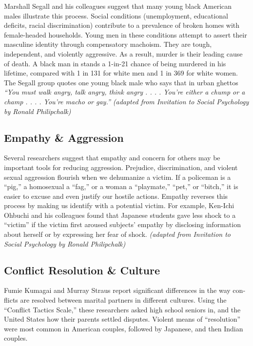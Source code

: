 \documentclass[
]{book}
\begin{document}
Marshall Segall and his colleagues suggest that many young black American males illustrate this process. Social conditions (unemployment, educational deficits, racial discrimination) contribute to a prevalence of broken homes with female-headed households. Young men in these conditions attempt to assert their masculine identity through compensatory machoism. They are tough, independent, and violently aggressive. As a result, murder is their leading cause of death. A black man in stands a 1-in-21 chance of being murdered in his lifetime, compared with 1 in 131 for white men and 1 in 369 for white women. The Segall group quotes one young black male who says that in urban ghettos \emph{``You must walk angry, talk angry, think angry . . . . You're either a chump or a champ . . . . You're macho or gay.'' (adapted from Invitation to Social Psychology by Ronald Philipchalk)}

\hypertarget{empathy-aggression}{%
\subsection*{Empathy \& Aggression}\label{empathy-aggression}}

Several researchers suggest that empathy and concern for others may be important tools for reducing aggression. Prejudice, discrimination, and violent sexual aggression flourish when we dehumanize a victim. If a policeman is a ``pig,'' a homosexual a ``fag,'' or a woman a ``playmate,'' ``pet,'' or ``bitch,'' it is easier to excuse and even justify our hostile actions. Empathy reverses this process by making us identify with a potential victim. For example, Ken-Ichi Ohbuchi and his colleagues found that Japanese students gave less shock to a ``victim'' if the victim first aroused subjects' empathy by disclosing information about herself or by expressing her fear of shock. \emph{(adapted from Invitation to Social Psychology by Ronald Philipchalk)}

\hypertarget{conflict-resolution-culture}{%
\subsection*{Conflict Resolution \& Culture}\label{conflict-resolution-culture}}

Fumie Kumagai and Murray Straus report significant differences in the way con­flicts are resolved between marital partners in different cultures. Using the ``Conflict Tactics Scale,'' these researchers asked high school seniors in, and the United States how their parents settled disputes. Violent means of ``resolution'' were most common in American couples, followed by Japanese, and then Indian couples.
\end{document}
